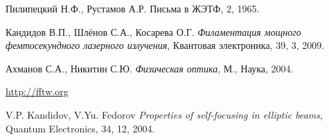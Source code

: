 \documentclass[12pt,a4paper]{article}
\begin{document}
	\tableofcontents

	
	
	
	
	
	
    

	\begin{thebibliography}{99}
	
		Пилипецкий Н.Ф., Рустамов А.Р.
		Письма в ЖЭТФ, 2, 1965.

		Кандидов В.П., Шлёнов С.А., Косарева О.Г.
		\textit{Филаментация мощного фемтосекундного лазерного излучения},
		Квантовая электроника, 39, 3, 2009.
		
		Ахманов С.А., Никитин С.Ю.
		\textit{Физическая оптика},
		М., Наука, 2004.

        \href{http://fftw.org}{http://fftw.org}

        V.P. Kandidov, V.Yu. Fedorov
        \textit{Properties of self-focusing in elliptic beams},
        Quantum Electronics, 34, 12, 2004.
		
	\end{thebibliography}
\end{document}
